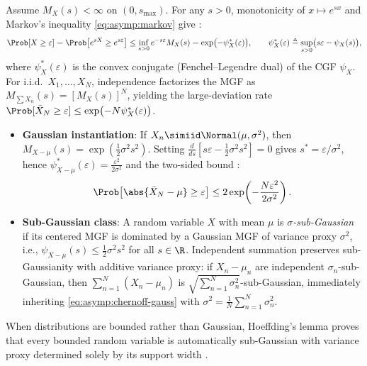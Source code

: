 \documentclass[../../../../master.tex]{subfiles}
\begin{document}
\begin{coremath}
Assume $M_X(s) < \infty$ on $(0, s_{\max})$. For any $s > 0$, monotonicity of $x \mapsto e^{sx}$ and Markov's inequality \eqref{eq:asymp:markov} give :
\begin{equation}
\label{eq:asymp:chernoff}
\Prob[X \ge \varepsilon] = \Prob\bigl[e^{sX} \ge e^{s\varepsilon}\bigr] \le \inf_{s > 0} e^{-s\varepsilon} M_X(s) = \exp\bigl(-\psi_X^*(\varepsilon)\bigr), \qquad \psi_X^*(\varepsilon) \triangleq \sup_{s > 0}\bigl(s\varepsilon - \psi_X(s)\bigr),
\end{equation}
where $\psi_X^*(\varepsilon)$ is the convex conjugate (Fenchel--Legendre dual) of the CGF $\psi_X$. For i.i.d.\ $X_1,\dots,X_N$, independence factorizes the MGF as $M_{\sum X_n}(s) = [M_X(s)]^N$, yielding the large-deviation rate $\Prob[\bar{X}_N \ge \varepsilon] \le \exp\bigl(-N \psi_X^*(\varepsilon)\bigr)$.
\begin{itemize}
  \item \textbf{Gaussian instantiation}: If $X_n \simiid \Normal(\mu, \sigma^2)$, then $M_{X-\mu}(s) = \exp(\tfrac{1}{2}\sigma^2 s^2)$. Setting $\frac{d}{ds}[s\varepsilon - \frac{1}{2}\sigma^2 s^2] = 0$ gives $s^* = \varepsilon/\sigma^2$, hence $\psi_{X-\mu}^*(\varepsilon) = \frac{\varepsilon^2}{2\sigma^2}$ and the two-sided bound :
  \begin{equation}
  \label{eq:asymp:chernoff-gauss}
  \Prob\bigl[\abs{\bar{X}_N - \mu} \ge \varepsilon\bigr] \le 2\exp\!\left(-\frac{N\varepsilon^2}{2\sigma^2}\right).
  \end{equation}
  \item \textbf{Sub-Gaussian class}: A random variable $X$ with mean $\mu$ is \emph{$\sigma$-sub-Gaussian} if its centered MGF is dominated by a Gaussian MGF of variance proxy $\sigma^2$, i.e., $\psi_{X-\mu}(s) \le \frac{1}{2}\sigma^2 s^2$ for all $s \in \R$. Independent summation preserves sub-Gaussianity with additive variance proxy: if $X_n - \mu_n$ are independent $\sigma_n$-sub-Gaussian, then $\sum_{n=1}^N (X_n - \mu_n)$ is $\sqrt{\sum_{n=1}^N \sigma_n^2}$-sub-Gaussian, immediately inheriting \eqref{eq:asymp:chernoff-gauss} with $\sigma^2 = \frac{1}{N}\sum_{n=1}^N \sigma_n^2$.
\end{itemize}
\end{coremath}

When distributions are bounded rather than Gaussian, Hoeffding's lemma proves that every bounded random variable is automatically sub-Gaussian with variance proxy determined solely by its support width .
\end{document}
